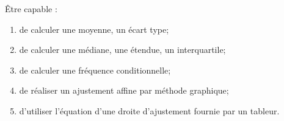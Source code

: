 \begin{myobj}
	Être capable : 
\begin{enumerate}
	\item de calculer une moyenne, un écart type;
	\item de calculer une médiane, une étendue, un interquartile;
	\item de calculer une fréquence conditionnelle;
	\item de réaliser un ajustement affine par méthode graphique;
	\item d'utiliser l'équation d'une droite d'ajustement fournie par un tableur.
\end{enumerate}
\end{myobj}